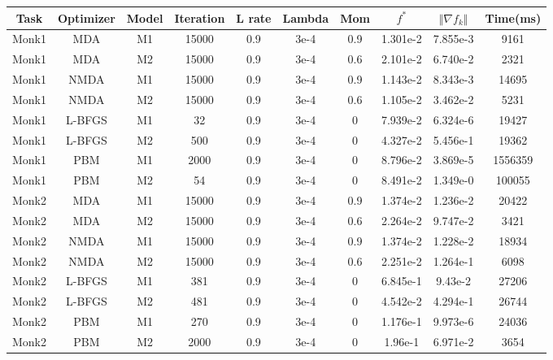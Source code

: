  \begin{center}
	\small\addtolength{\tabcolsep}{-3pt}
		\centering
		\begin{longtable}{|c|c|c|c|c|c|c|c|c|c|}
			\hline
			\textbf{Task}& \textbf{Optimizer}&\textbf{Model}&\textbf{Iteration} & \textbf{L rate} & \multicolumn{1}{l|}{\textbf{Lambda}} & \textbf{Mom} & \textbf{$f^{*}$}& \textbf{$\Vert \nabla f_{k}\Vert$ }& \textbf{Time(ms)}\\ \hline 
			Monk1 & MDA & M1 & 15000 & 0.9 & 3e-4  & 0.9 & 1.301e-2  & 7.855e-3 & 9161 \\
			Monk1 & MDA & M2 & 15000 & 0.9 & 3e-4  & 0.6 & 2.101e-2 & 6.740e-2 &  2321\\
			Monk1 & NMDA & M1 & 15000 & 0.9 & 3e-4  & 0.9 & 1.143e-2 & 8.343e-3 & 14695 \\
			Monk1 & NMDA & M2 & 15000 & 0.9 & 3e-4  & 0.6 & 1.105e-2 & 3.462e-2 & 5231 \\
			Monk1 & L-BFGS & M1 & 32 & 0.9 & 3e-4  & 0 &  7.939e-2 & 6.324e-6 & 19427  \\
			Monk1 & L-BFGS & M2 & 500 & 0.9 & 3e-4  & 0 &   4.327e-2 & 5.456e-1 & 19362 \\
			Monk1 & PBM & M1 & 2000 & 0.9 & 3e-4  & 0 & 8.796e-2  & 3.869e-5 & 1556359 \\
			Monk1 & PBM & M2 & 54 & 0.9 & 3e-4  & 0 & 8.491e-2 & 1.349e-0 & 100055 \\
			
			Monk2 & MDA & M1 & 15000 & 0.9 & 3e-4  & 0.9 & 1.374e-2 & 1.236e-2 & 20422 \\
			Monk2 & MDA & M2 & 15000 & 0.9 & 3e-4  & 0.6 & 2.264e-2 & 9.747e-2 & 3421 \\
			Monk2 & NMDA & M1 & 15000 & 0.9 & 3e-4  & 0.9 &  1.374e-2 & 1.228e-2 & 18934  \\
			Monk2 & NMDA & M2 & 15000 & 0.9 & 3e-4  & 0.6 & 2.251e-2 & 1.264e-1 & 6098 \\
			Monk2 & L-BFGS & M1 & 381 & 0.9 & 3e-4  & 0 & 6.845e-1 & 9.43e-2 & 27206 \\
			Monk2 & L-BFGS & M2 & 481 & 0.9 & 3e-4  & 0 & 4.542e-2 & 4.294e-1 & 26744 \\
			Monk2 & PBM & M1 & 270 & 0.9 & 3e-4  & 0 & 1.176e-1  & 9.973e-6 & 24036 \\
			Monk2 & PBM & M2 & 2000 & 0.9 & 3e-4  & 0 & 1.96e-1  & 6.971e-2 & 3654 \\
			

\end{longtable}
\end{center}
